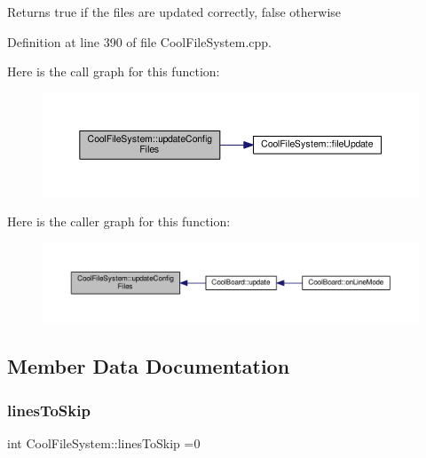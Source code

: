 \begin{DoxyReturn}{Returns}
true if the files are updated correctly, false otherwise 
\end{DoxyReturn}


Definition at line 390 of file Cool\+File\+System.\+cpp.

Here is the call graph for this function\+:\nopagebreak
\begin{figure}[H]
\begin{center}
\leavevmode
\includegraphics[width=350pt]{class_cool_file_system_adfa8e2e80641ae6f0cceabd348a9b841_cgraph}
\end{center}
\end{figure}
Here is the caller graph for this function\+:\nopagebreak
\begin{figure}[H]
\begin{center}
\leavevmode
\includegraphics[width=350pt]{class_cool_file_system_adfa8e2e80641ae6f0cceabd348a9b841_icgraph}
\end{center}
\end{figure}


\subsection{Member Data Documentation}
\mbox{\label{class_cool_file_system_a84fdb6057e534b395512463daa28ea3c}} 
\subsubsection{\texorpdfstring{lines\+To\+Skip}{linesToSkip}}
{\footnotesize\ttfamily int Cool\+File\+System\+::lines\+To\+Skip =0\hspace{0.3cm}{\ttfamily [private]}}

